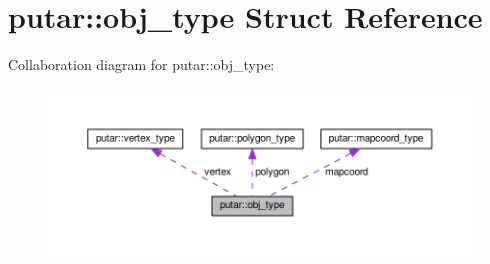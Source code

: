 \hypertarget{structputar_1_1obj__type}{}\section{putar\+:\+:obj\+\_\+type Struct Reference}
\label{structputar_1_1obj__type}


Collaboration diagram for putar\+:\+:obj\+\_\+type\+:
\nopagebreak
\begin{figure}[H]
\begin{center}
\leavevmode
\includegraphics[width=350pt]{structputar_1_1obj__type__coll__graph}
\end{center}
\end{figure}
